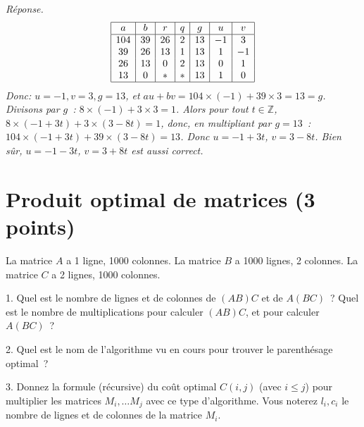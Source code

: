 \documentclass[11pt]{article}
\def\Z{\mathbb Z}
\begin{document}
\ifcorrige
{\it Réponse.
$$\begin{array}{|c|c|c|c|c|c|c|}
\hline
a & b & r & q & g & u & v \\
\hline
104 & 39 & 26 & 2 & 13 & -1 & 3 \\
39 & 26 & 13 & 1 & 13 & 1 & -1 \\
26 & 13 & 0 & 2 & 13 & 0 & 1 \\
13 & 0 & * & * & 13 & 1 & 0 \\
\hline
\end{array}
$$
Donc: $u=-1, v=3, g=13$, et $au+bv=104\times  (-1) + 39\times 3= 13=g$.
Divisons par $g$~: $8\times (-1) + 3\times 3=1$. Alors pour tout $t\in \Z$,
$8\times (-1+3t) + 3\times (3-8t)=1$, donc, en multipliant par $g=13$~: $104\times (-1+3t) + 39\times (3-8t)=13$.
Donc $u=-1+3t$, $v=3-8t$. Bien sûr, $u=-1-3t$, $v=3+8t$ est aussi correct.
}
\else\fi

\section{Produit optimal de matrices (3 points)}
La matrice $A$ a 1 ligne, 1000 colonnes.
La matrice $B$ a 1000 lignes, 2 colonnes.
La matrice $C$ a 2 lignes, 1000 colonnes.
 

1. Quel est le nombre de lignes et de colonnes de $(AB)C$ et de $A(BC)$~?
Quel est le nombre de multiplications pour calculer $(AB)C$, et pour calculer $A(BC)$~?

2. Quel est le nom de l'algorithme vu en cours pour trouver le parenthésage optimal~?

 

3. Donnez la formule (récursive) du coût optimal $C(i, j)$ (avec $i\le j$) pour multiplier les matrices
$M_i, \ldots M_j$ avec ce type d'algorithme. Vous noterez $l_i, c_i$ le nombre de lignes et de colonnes de la matrice $M_i$.

\else\fi
\end{document}
